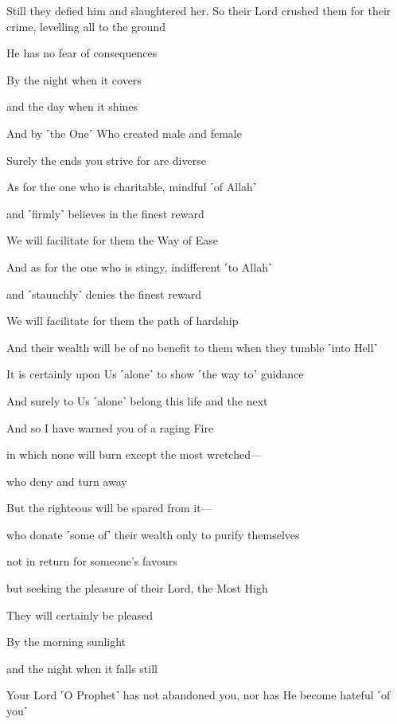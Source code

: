 Still they defied him and slaughtered her. So their Lord crushed them for their crime, levelling all to the ground

He has no fear of consequences

By the night when it covers

and the day when it shines

And by ˹the One˺ Who created male and female

Surely the ends you strive for are diverse

As for the one who is charitable, mindful ˹of Allah˺

and ˹firmly˺ believes in the finest reward

We will facilitate for them the Way of Ease

And as for the one who is stingy, indifferent ˹to Allah˺

and ˹staunchly˺ denies the finest reward

We will facilitate for them the path of hardship

And their wealth will be of no benefit to them when they tumble ˹into Hell˺

It is certainly upon Us ˹alone˺ to show ˹the way to˺ guidance

And surely to Us ˹alone˺ belong this life and the next

And so I have warned you of a raging Fire

in which none will burn except the most wretched—

who deny and turn away

But the righteous will be spared from it—

who donate ˹some of˺ their wealth only to purify themselves

not in return for someone’s favours

but seeking the pleasure of their Lord, the Most High

They will certainly be pleased

By the morning sunlight

and the night when it falls still

Your Lord ˹O Prophet˺ has not abandoned you, nor has He become hateful ˹of you˺

